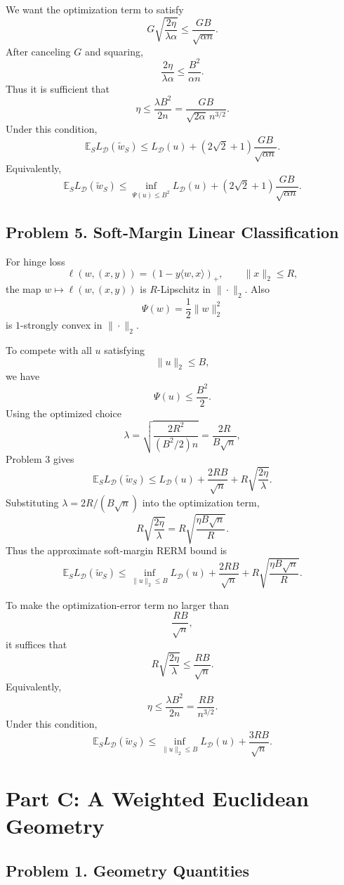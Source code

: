 \documentclass{article}
\newcommand{\EE}{\mathbb{E}}
\newcommand{\cD}{\mathcal{D}}
\begin{document}
We want the optimization term to satisfy
$$
G\sqrt{\frac{2\eta}{\lambda\alpha}}
\le
\frac{GB}{\sqrt{\alpha n}}.
$$
After canceling $G$ and squaring,
$$
\frac{2\eta}{\lambda\alpha}
\le
\frac{B^2}{\alpha n}.
$$
Thus it is sufficient that
$$
\eta
\le
\frac{\lambda B^2}{2n}
=
\frac{GB}{\sqrt{2\alpha}\,n^{3/2}}.
$$
Under this condition,
$$
\EE_S L_{\cD}(\widetilde{w}_S)
\le
L_{\cD}(u)
+
(2\sqrt{2}+1)\frac{GB}{\sqrt{\alpha n}}.
$$
Equivalently,
$$
\EE_S L_{\cD}(\widetilde{w}_S)
\le
\inf_{\Psi(u)\le B^2}L_{\cD}(u)
+
(2\sqrt{2}+1)\frac{GB}{\sqrt{\alpha n}}.
$$

\subsection{Problem 5. Soft-Margin Linear Classification}

For hinge loss
$$
\ell(w,(x,y))=(1-y\langle w,x\rangle)_+,
\qquad
\|x\|_2\le R,
$$
the map $w\mapsto \ell(w,(x,y))$ is $R$-Lipschitz in $\|\cdot\|_2$. Also
$$
\Psi(w)=\frac12\|w\|_2^2
$$
is $1$-strongly convex in $\|\cdot\|_2$.

To compete with all $u$ satisfying
$$
\|u\|_2\le B,
$$
we have
$$
\Psi(u)\le \frac{B^2}{2}.
$$
Using the optimized choice
$$
\lambda
=
\sqrt{\frac{2R^2}{(B^2/2)n}}
=
\frac{2R}{B\sqrt{n}},
$$
Problem 3 gives
$$
\EE_S L_{\cD}(\widetilde{w}_S)
\le
L_{\cD}(u)
+
\frac{2RB}{\sqrt{n}}
+
R\sqrt{\frac{2\eta}{\lambda}}.
$$
Substituting $\lambda=2R/(B\sqrt n)$ into the optimization term,
$$
R\sqrt{\frac{2\eta}{\lambda}}
=
R\sqrt{\frac{\eta B\sqrt n}{R}}.
$$
Thus the approximate soft-margin RERM bound is
$$
\EE_S L_{\cD}(\widetilde{w}_S)
\le
\inf_{\|u\|_2\le B}L_{\cD}(u)
+
\frac{2RB}{\sqrt{n}}
+
R\sqrt{\frac{\eta B\sqrt n}{R}}.
$$

To make the optimization-error term no larger than
$$
\frac{RB}{\sqrt n},
$$
it suffices that
$$
R\sqrt{\frac{2\eta}{\lambda}}
\le
\frac{RB}{\sqrt n}.
$$
Equivalently,
$$
\eta\le \frac{\lambda B^2}{2n}
=
\frac{RB}{n^{3/2}}.
$$
Under this condition,
$$
\EE_S L_{\cD}(\widetilde{w}_S)
\le
\inf_{\|u\|_2\le B}L_{\cD}(u)
+
\frac{3RB}{\sqrt n}.
$$

\newpage
\section{Part C: A Weighted Euclidean Geometry}

\subsection{Problem 1. Geometry Quantities}
\end{document}
